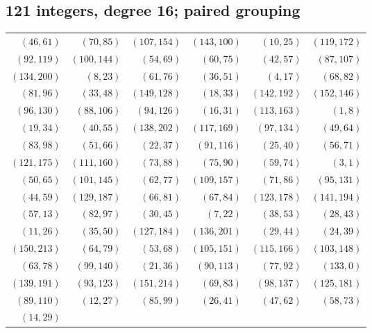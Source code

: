 \subsection*{121 integers, degree 16; paired grouping}
\begingroup\small
\begin{longtable}{rrrrrr}
$(46,61)$ & $(70,85)$ & $(107,154)$ & $(143,100)$ & $(10,25)$ & $(119,172)$\\
$(92,119)$ & $(100,144)$ & $(54,69)$ & $(60,75)$ & $(42,57)$ & $(87,107)$\\
$(134,200)$ & $(8,23)$ & $(61,76)$ & $(36,51)$ & $(4,17)$ & $(68,82)$\\
$(81,96)$ & $(33,48)$ & $(149,128)$ & $(18,33)$ & $(142,192)$ & $(152,146)$\\
$(96,130)$ & $(88,106)$ & $(94,126)$ & $(16,31)$ & $(113,163)$ & $(1,8)$\\
$(19,34)$ & $(40,55)$ & $(138,202)$ & $(117,169)$ & $(97,134)$ & $(49,64)$\\
$(83,98)$ & $(51,66)$ & $(22,37)$ & $(91,116)$ & $(25,40)$ & $(56,71)$\\
$(121,175)$ & $(111,160)$ & $(73,88)$ & $(75,90)$ & $(59,74)$ & $(3,1)$\\
$(50,65)$ & $(101,145)$ & $(62,77)$ & $(109,157)$ & $(71,86)$ & $(95,131)$\\
$(44,59)$ & $(129,187)$ & $(66,81)$ & $(67,84)$ & $(123,178)$ & $(141,194)$\\
$(57,13)$ & $(82,97)$ & $(30,45)$ & $(7,22)$ & $(38,53)$ & $(28,43)$\\
$(11,26)$ & $(35,50)$ & $(127,184)$ & $(136,201)$ & $(29,44)$ & $(24,39)$\\
$(150,213)$ & $(64,79)$ & $(53,68)$ & $(105,151)$ & $(115,166)$ & $(103,148)$\\
$(63,78)$ & $(99,140)$ & $(21,36)$ & $(90,113)$ & $(77,92)$ & $(133,0)$\\
$(139,191)$ & $(93,123)$ & $(151,214)$ & $(69,83)$ & $(98,137)$ & $(125,181)$\\
$(89,110)$ & $(12,27)$ & $(85,99)$ & $(26,41)$ & $(47,62)$ & $(58,73)$\\
$(14,29)$ & & & & &\\
\end{longtable}
\endgroup
